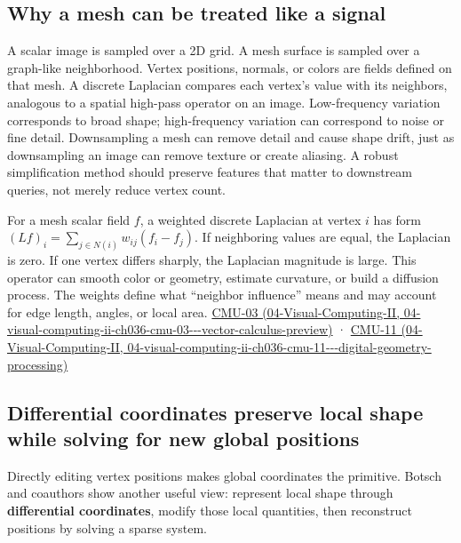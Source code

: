\subsection{Why a mesh can be treated like a signal}\label{03-visual-computing-i-ch002-why-a-mesh-can-be-treated-like-a-signal}

A scalar image is sampled over a 2D grid. A mesh surface is sampled over a graph-like neighborhood. Vertex positions, normals, or colors are fields defined on that mesh. A discrete Laplacian compares each vertex's value with its neighbors, analogous to a spatial high-pass operator on an image. Low-frequency variation corresponds to broad shape; high-frequency variation can correspond to noise or fine detail. Downsampling a mesh can remove detail and cause shape drift, just as downsampling an image can remove texture or create aliasing. A robust simplification method should preserve features that matter to downstream queries, not merely reduce vertex count.

For a mesh scalar field \(f\), a weighted discrete Laplacian at vertex \(i\) has form \((Lf)_i=\sum_{j\in N(i)}w_{ij}(f_i-f_j)\). If neighboring values are equal, the Laplacian is zero. If one vertex differs sharply, the Laplacian magnitude is large. This operator can smooth color or geometry, estimate curvature, or build a diffusion process. The weights define what ``neighbor influence'' means and may account for edge length, angles, or local area. \href{../04-Visual-Computing-II/main.pdf\#nameddest=04-visual-computing-ii-ch036-cmu-03---vector-calculus-preview}{CMU-03 (04-Visual-Computing-II, 04-visual-computing-ii-ch036-cmu-03-\/-\/-vector-calculus-preview)} · \href{../04-Visual-Computing-II/main.pdf\#nameddest=04-visual-computing-ii-ch036-cmu-11---digital-geometry-processing}{CMU-11 (04-Visual-Computing-II, 04-visual-computing-ii-ch036-cmu-11-\/-\/-digital-geometry-processing)}

\subsection{Differential coordinates preserve local shape while solving for new global positions}\label{03-visual-computing-i-ch002-differential-coordinates-preserve-local-shape-while-solving-for-new-global-positions}

Directly editing vertex positions makes global coordinates the primitive. Botsch and coauthors show another useful view: represent local shape through \textbf{differential coordinates}, modify those local quantities, then reconstruct positions by solving a sparse system.

